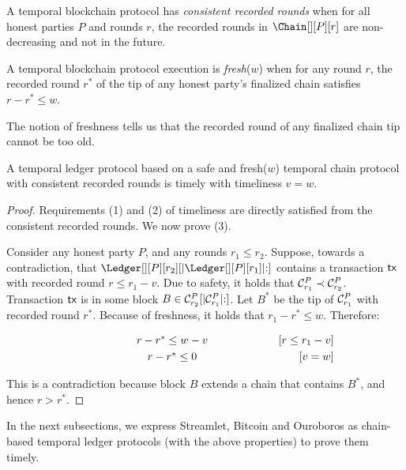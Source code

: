 \begin{definition}
  A temporal blockchain protocol has \emph{consistent recorded rounds}
  when for all honest parties $P$ and rounds $r$,
  the recorded rounds in $\Chain[][P][r]$ are non-decreasing and not
  in the future.
\end{definition}

\begin{definition}[Freshness] \label{def:tip-freshness}
  A temporal blockchain protocol execution is \emph{fresh}($w$) when for
  any round $r$, the recorded round
  $r^*$ of the tip of any honest party's finalized chain
  satisfies $r - r^* \leq w$.
\end{definition}

The notion of freshness tells us that the recorded round
of any finalized chain tip cannot be too old.

\begin{theorem}
  A temporal ledger protocol based on a safe and fresh($w$)
  temporal chain protocol with consistent recorded rounds is timely with timeliness $v = w$.
\end{theorem}
\begin{proof}
  Requirements (1) and (2) of timeliness are directly satisfied from
  the consistent recorded rounds.
  We now prove (3).

  Consider any honest party $P$, and any rounds $r_1 \leq r_2$.
  Suppose, towards a contradiction, that $\Ledger[][P][r_2][|\Ledger[][P][r_1]|{:}]$
  contains a transaction $\textsf{tx}$ with recorded round $r \leq r_1 - v$.
  Due to safety, it holds that $\mathcal{C}^P_{r_1} \prec \mathcal{C}^P_{r_2}$.
  Transaction $\textsf{tx}$ is in some block $B \in \mathcal{C}^P_{r_2}[|\mathcal{C}^P_{r_1}|{:}]$.
  Let $B^*$ be the tip of $\mathcal{C}^P_{r_1}$ with recorded round $r^*$.
  Because of freshness, it holds that $r_1 - r^* \leq w$.
  Therefore:

  \begin{align*}
    \makebox[0.5\textwidth][c]{$r - r^* \leq w - v$}         && \text{[$r \leq r_1 - v$]} \\
    \makebox[0.5\textwidth][c]{$r - r^* \leq 0$}             && \text{[$v = w$]}
  \end{align*}

  This is a contradiction because block $B$ extends a chain that contains $B^*$,
  and hence $r > r^*$.
  \Qed
\end{proof}

In the next subsections, we express Streamlet, Bitcoin and Ouroboros
as chain-based temporal ledger protocols (with the above properties) to
prove them timely.

